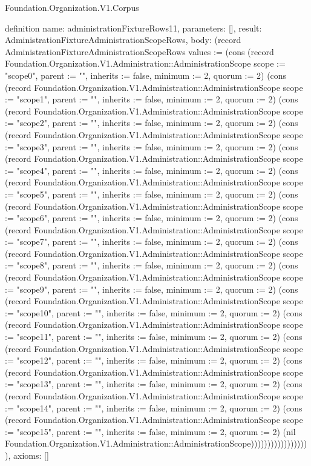\begin{lexlean}{Foundation.Organization.V1.Corpus}
\begin{semanticmodule}
definition{
  name: administrationFixtureRows11,
  parameters: [],
  result: AdministrationFixtureAdministrationScopeRows,
  body: (record AdministrationFixtureAdministrationScopeRows {values := (cons (record Foundation.Organization.V1.Administration::AdministrationScope {scope := "scope0", parent := "", inherits := false, minimum := 2, quorum := 2}) (cons (record Foundation.Organization.V1.Administration::AdministrationScope {scope := "scope1", parent := "", inherits := false, minimum := 2, quorum := 2}) (cons (record Foundation.Organization.V1.Administration::AdministrationScope {scope := "scope2", parent := "", inherits := false, minimum := 2, quorum := 2}) (cons (record Foundation.Organization.V1.Administration::AdministrationScope {scope := "scope3", parent := "", inherits := false, minimum := 2, quorum := 2}) (cons (record Foundation.Organization.V1.Administration::AdministrationScope {scope := "scope4", parent := "", inherits := false, minimum := 2, quorum := 2}) (cons (record Foundation.Organization.V1.Administration::AdministrationScope {scope := "scope5", parent := "", inherits := false, minimum := 2, quorum := 2}) (cons (record Foundation.Organization.V1.Administration::AdministrationScope {scope := "scope6", parent := "", inherits := false, minimum := 2, quorum := 2}) (cons (record Foundation.Organization.V1.Administration::AdministrationScope {scope := "scope7", parent := "", inherits := false, minimum := 2, quorum := 2}) (cons (record Foundation.Organization.V1.Administration::AdministrationScope {scope := "scope8", parent := "", inherits := false, minimum := 2, quorum := 2}) (cons (record Foundation.Organization.V1.Administration::AdministrationScope {scope := "scope9", parent := "", inherits := false, minimum := 2, quorum := 2}) (cons (record Foundation.Organization.V1.Administration::AdministrationScope {scope := "scope10", parent := "", inherits := false, minimum := 2, quorum := 2}) (cons (record Foundation.Organization.V1.Administration::AdministrationScope {scope := "scope11", parent := "", inherits := false, minimum := 2, quorum := 2}) (cons (record Foundation.Organization.V1.Administration::AdministrationScope {scope := "scope12", parent := "", inherits := false, minimum := 2, quorum := 2}) (cons (record Foundation.Organization.V1.Administration::AdministrationScope {scope := "scope13", parent := "", inherits := false, minimum := 2, quorum := 2}) (cons (record Foundation.Organization.V1.Administration::AdministrationScope {scope := "scope14", parent := "", inherits := false, minimum := 2, quorum := 2}) (cons (record Foundation.Organization.V1.Administration::AdministrationScope {scope := "scope15", parent := "", inherits := false, minimum := 2, quorum := 2}) (nil Foundation.Organization.V1.Administration::AdministrationScope)))))))))))))))))}),
  axioms: []
}


\end{semanticmodule}
\end{lexlean}
